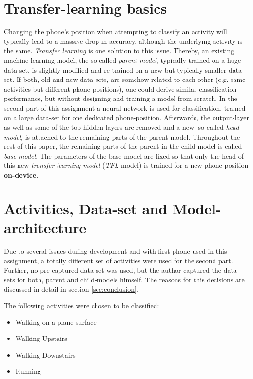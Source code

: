 \documentclass[journal]{IEEEtran}
\begin{document}
\section{Transfer-learning basics}
Changing the phone's position when attempting to classify an activity will
typically lead to a massive drop in accuracy, although the underlying activity
is the same. \textit{Transfer learning} is one solution to this issue. Thereby,
an existing machine-learning model, the so-called \textit{parent-model}, 
typically trained on a huge data-set, is slightly modified and re-trained on a 
new but typically smaller data-set.
If both, old and new
data-sets, are somehow related to each other (e.g. same activities but different
phone positions), one could derive similar classification performance, but
without designing and training a model from scratch.\newline
In the second part of this assignment a neural-network is used for
classification, trained on a large
data-set for one dedicated phone-position. Afterwards, the output-layer as well as
some of the top hidden layers are removed and a new, so-called \textit{head-model},
is attached to the remaining parts of the parent-model. Throughout the rest of this
paper, the remaining parts of the parent in the child-model is called \textit{base-model}.
 The parameters of the base-model are fixed so that only
the head of this new \textit{transfer-learning model} (\textit{TFL}-model) is
trained for a new phone-position \textbf{on-device}.

\section{Activities, Data-set and Model-architecture}
Due to several issues during development and with first phone
used in this assignment, a totally different set of activities
were used for the second part. Further, no pre-captured data-set was used,
but the author captured the data-sets for both, parent and child-models himself.
The reasons for this decisions are discussed in detail in section \ref{sec:conclusion}.\newline

The following activities were chosen to be classified:
\begin{itemize}
    \item Walking on a plane surface
    \item Walking Upstairs
    \item Walking Downstairs
    \item Running
\end{itemize}
\end{document}
